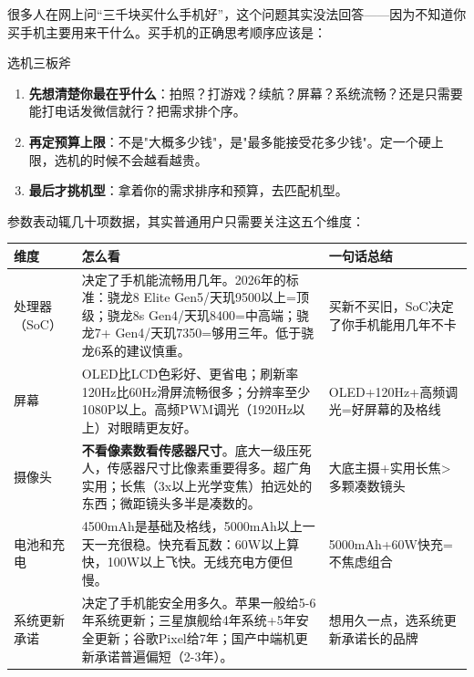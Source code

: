 


很多人在网上问“三千块买什么手机好”，这个问题其实没法回答——因为不知道你买手机主要用来干什么。买手机的正确思考顺序应该是：

\begin{tcbinfo}{选机三板斧}
\begin{enumerate}
  \item \textbf{先想清楚你最在乎什么}：拍照？打游戏？续航？屏幕？系统流畅？还是只需要能打电话发微信就行？把需求排个序。
  \item \textbf{再定预算上限}：不是"大概多少钱"，是"最多能接受花多少钱"。定一个硬上限，选机的时候不会越看越贵。
  \item \textbf{最后才挑机型}：拿着你的需求排序和预算，去匹配机型。
\end{enumerate}

\end{tcbinfo}


参数表动辄几十项数据，其实普通用户只需要关注这五个维度：

\begin{center}
\begin{tabularx}{\linewidth}{|X|X|X|}
\hline
\textbf{维度} & \textbf{怎么看} & \textbf{一句话总结} \tabularnewline
\hline
处理器（SoC） & 决定了手机能流畅用几年。2026年的标准：骁龙8 Elite Gen5/天玑9500以上=顶级；骁龙8s Gen4/天玑8400=中高端；骁龙7+ Gen4/天玑7350=够用三年。低于骁龙6系的建议慎重。 & 买新不买旧，SoC决定了你手机能用几年不卡 \tabularnewline
屏幕 & OLED比LCD色彩好、更省电；刷新率120Hz比60Hz滑屏流畅很多；分辨率至少1080P以上。高频PWM调光（1920Hz以上）对眼睛更友好。 & OLED+120Hz+高频调光=好屏幕的及格线 \tabularnewline
摄像头 & \textbf{不看像素数看传感器尺寸}。底大一级压死人，传感器尺寸比像素重要得多。超广角实用；长焦（3x以上光学变焦）拍远处的东西；微距镜头多半是凑数的。 & 大底主摄+实用长焦>多颗凑数镜头 \tabularnewline
电池和充电 & 4500mAh是基础及格线，5000mAh以上一天一充很稳。快充看瓦数：60W以上算快，100W以上飞快。无线充电方便但慢。 & 5000mAh+60W快充=不焦虑组合 \tabularnewline
系统更新承诺 & 决定了手机能安全用多久。苹果一般给5-6年系统更新；三星旗舰给4年系统+5年安全更新；谷歌Pixel给7年；国产中端机更新承诺普遍偏短（2-3年）。 & 想用久一点，选系统更新承诺长的品牌 \tabularnewline
\hline
\end{tabularx}
\end{center}

